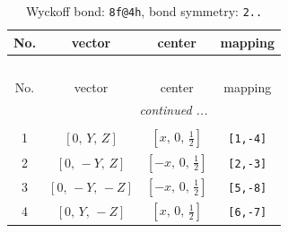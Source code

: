 \documentclass[fleqn,8pt]{jsarticle}
\begin{document}
\renewcommand{\arraystretch}{1.2}
\begin{longtable}{cccc}
\caption{Wyckoff bond: {\tt 8f@4h}, bond symmetry: {\tt 2..}}
 \\
 \hline \hline
No. & vector & center & mapping \\ \hline \endfirsthead

\multicolumn{3}{l}{\tablename\ \thetable{}} \\
 \hline \hline
No. & vector & center & mapping \\ \hline \endhead

 \hline \hline
\multicolumn{3}{r}{\footnotesize\it continued ...} \\ \endfoot

 \hline \hline
\multicolumn{3}{r}{} \\ \endlastfoot

1 & $\left[ 0,\, Y,\, Z \right]$ & $\left[ x,\, 0,\, \frac{1}{2} \right]$ & {\tt [1,-4]} \\ \hline
2 & $\left[ 0,\, - Y,\, Z \right]$ & $\left[ - x,\, 0,\, \frac{1}{2} \right]$ & {\tt [2,-3]} \\ \hline
3 & $\left[ 0,\, - Y,\, - Z \right]$ & $\left[ - x,\, 0,\, \frac{1}{2} \right]$ & {\tt [5,-8]} \\ \hline
4 & $\left[ 0,\, Y,\, - Z \right]$ & $\left[ x,\, 0,\, \frac{1}{2} \right]$ & {\tt [6,-7]} \\
\end{longtable}
\renewcommand{\arraystretch}{1.2}
\end{document}
